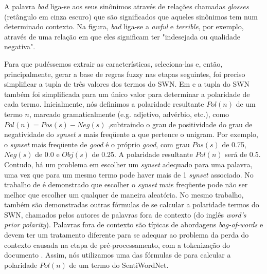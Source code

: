 A palavra \textit{bad} liga-se aos seus sinônimos através de relações chamadas \textit{glosses} (retângulo em cinza escuro) que são significados que aqueles sinônimos tem num determinado contexto. Na figura, \textit{bad} liga-se a \textit{awful} e \textit{terrible}, por exemplo, através de uma relação em que eles significam ter "indesejada ou qualidade negativa".
 
 
Para que pudéssemos extrair as características, seleciona-las e, então, principalmente, gerar a base de regras fuzzy nas etapas seguintes, foi preciso simplificar a tupla de três valores dos termos do SWN. Em \cite{ohana2009sentiment} e \cite{khan2011sentiment} a tupla do SWN também foi simplificada para um único valor para determinar a polaridade de cada termo. Inicialmente, nós definimos a polaridade resultante $Pol(n)$ de um termo  $n$, marcado gramaticalmente (e.g. adjetivo, advérbio, etc.), como $Pol(n) = Pos(s) - Neg(s)$ ,subtraindo o grau de positividade do grau de negatividade do \textit{synset} $s$ mais freqüente a que pertence o unigram. Por exemplo, o \textit{synset} mais freqüente de \textit{good} é o próprio \textit{good}, com grau $Pos(s)$ de 0.75, $Neg(s)$ de 0.0 e $Obj(s)$ de 0.25. A polaridade resultante $Pol(n)$ será de 0.5. Contudo, há um problema em escolher um \textit{synset} adequado para uma palavra, uma vez que para um mesmo termo pode haver mais de 1 \textit{synset} associado. No trabalho de \cite{guerini2013sentiment} é demonstrado que escolher o \textit{synset} mais freqüente pode não ser melhor que escolher um qualquer de maneira aleatória. No mesmo trabalho, também são demonstradas outras fórmulas de se calcular a polaridade termos do SWN, chamados pelos autores de palavras fora de contexto (do inglês \textit{word’s prior polarity}). Palavras fora de contexto são típicas de abordagens \textit{bag-of-words} e devem ter um tratamento diferente para se adequar ao problema da perda do contexto causada na etapa de pré-processamento, com a tokenização do documento \cite{guerini2013sentiment}. Assim, nós utilizamos uma das fórmulas de \cite{guerini2013sentiment} para calcular a polaridade $Pol(n)$ de um termo do SentiWordNet. 


